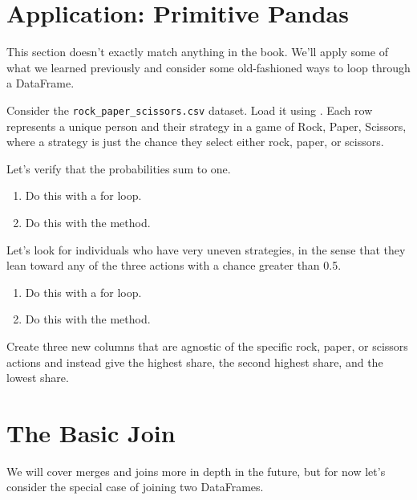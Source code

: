 

\section{Application: Primitive Pandas}

This section doesn't exactly match anything in the book. We'll apply some of what we learned previously and consider some old-fashioned ways to loop through a DataFrame.

Consider the \texttt{rock\_paper\_scissors.csv} dataset. Load it using . Each row represents a unique person and their strategy in a game of Rock, Paper, Scissors, where a strategy is just the chance they select either rock, paper, or scissors.

Let's verify that the probabilities sum to one. 

\begin{enumerate}
    \item Do this with a for loop.
    \item Do this with the  method.
\end{enumerate}


Let's look for individuals who have very uneven strategies, in the sense that they lean toward any of the three actions with a chance greater than 0.5.

\begin{enumerate}
    \item Do this with a for loop.
    \item Do this with the  method.
\end{enumerate}


Create three new columns that are agnostic of the specific rock, paper, or scissors actions and instead give the highest share, the second highest share, and the lowest share. 

\section{The Basic Join}

We will cover merges and joins more in depth in the future, but for now let's consider the special case of joining two DataFrames. 

